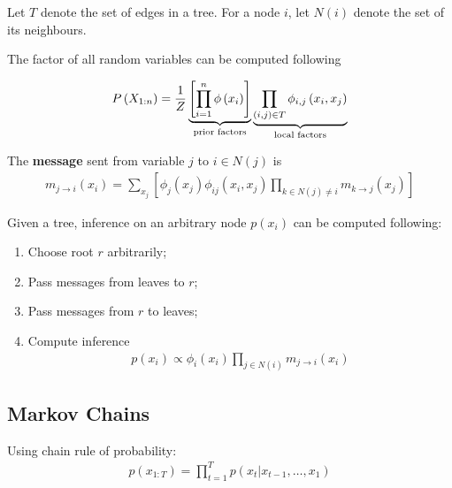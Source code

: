 \documentclass{article}
\begin{document}
	\begin{notation}
		Let $T$ denote the set of edges in a tree. For a node $i$, let $N(i)$ denote the set of its neighbours.
	\end{notation}
	
	The factor of all random variables can be computed following
	
	\begin{align}
		P\left(X_{1: n}\right)
		=\frac{1}{Z} \underbrace{\left[ \prod_{i=1}^n \phi\left(x_{i}\right)
		\right]}_{\text{{prior factors}}}
		\underbrace{\prod_{(i, j) \in T} \phi_{i, j}\left(x_{i}, x_{j}\right)}_{\text{{local factors}}}
	\end{align}
	
	\begin{definition}
		The \textbf{message} sent from variable $j$ to $i \in N(j)$ is
		\begin{align}
			m_{j \rightarrow i}\left(x_{i}\right)
			=\sum_{x_{j}}
			\left [
			\phi_{j}\left(x_{j}\right) \phi_{i j}\left(x_{i}, x_{j}\right)
			\prod_{k \in N(j) \neq i} m_{k \rightarrow j}\left(x_{j}\right)
			\right ]
		\end{align}
	\end{definition}
	
	\begin{algorithm}
		Given a tree, inference on an arbitrary node $p(x_i)$ can be computed following:
		\begin{enumerate}
			\item Choose root $r$ arbitrarily;
			\item Pass messages from leaves to $r$;
			\item Pass messages from $r$ to leaves;
			\item Compute inference
			\begin{align}
				p\left(x_{i}\right) \propto \phi_{i}\left(x_{i}\right) \prod_{j \in N(i)} m_{j \rightarrow i}\left(x_{i}\right)
			\end{align}
		\end{enumerate}
	\end{algorithm}
	
	\subsection{Markov Chains}
	\par Using chain rule of probability:
	\begin{align}
		p\left(x_{1: T}\right)=\prod_{t=1}^{T} p\left(x_{t} | x_{t-1}, \ldots, x_{1}\right)
	\end{align}
	
\end{document}
